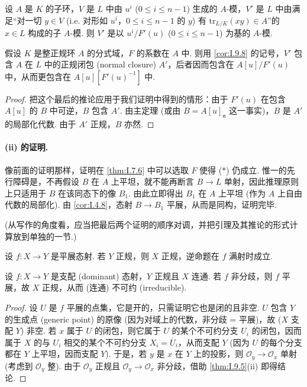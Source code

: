 \begin{corollary}\label{cor:I.9.8}
设 $A$ 是 $K$ 的子环，$V$ 是 $L$ 中由 $u^i$ ($0 \leqslant i \leqslant n-1$) 生成的 $A$-模，$V'$ 是 $L$ 中由满足``对一切 $y \in V$ (i.e. 对形如 $u^i$，$0 \leqslant i \leqslant n-1$ 的 $y$) 有 $\mathrm{tr}_{L/K}(xy) \in A$''的 $x \in L$ 构成的子 $A$-模. 则 $V'$ 是以 $u^{i}/F'(u)$ ($0 \leqslant i \leqslant n-1$) 为基的 $A$-模.
\end{corollary}

\begin{corollary}\label{cor:I.9.9}
假设 $K$ 是整正规环 $A$ 的分式域，$F$ 的系数在 $A$ 中. 则用 \ref{cor:I.9.8} 的记号，$V'$ 包含 $A$ 在 $L$ 中的正规闭包 (normal closure) $A'$，后者因而包含在 $A[u]/F'(u)$ 中，从而更包含在 $A[u][F'(u)^{-1}]$ 中.
\end{corollary}

\begin{proof}
把这个最后的推论应用于我们证明中得到的情形：由于 $F'(u)$ 在包含 $A[u]$ 的 $B$ 中可逆，$B$ 包含 $A'$. 由主定理 (或由 $B = A[u]_{\mathfrak{n}}$ 这一事实)，$B$ 是 $A'$ 的局部化代数. 由于 $A'$ 正规，$B$ 亦然.
\end{proof}

\paragraph*{(ii) 的证明.} 像前面的证明那样，证明在 \ref{thm:I.7.6} 中可以选取 $F$ 使得 ($*$) 仍成立. 惟一的先行障碍是，不再假设 $B$ 在 $A$ 上平坦，就不能再断言 $B \to L$ 单射，因此推理原则上只适用于 $B$ 在该同态下的像 $B_1$. 由此立即得出 $B_1$ 在 $A$ 上平坦 (作为 $A$ 上自由代数的局部化). 由 \ref{cor:I.4.8}，态射 $B \to B_1$ 平展，从而是同构，证明完毕.

(从写作的角度看，应当把最后两个证明的顺序对调，并把引理及其推论的形式计算放到单独的一节.)

\begin{corollary}\label{cor:I.9.10}
设 $f \colon X \to Y$ 是平展态射. 若 $Y$ 正规，则 $X$ 正规，逆命题在 $f$ 满射时成立.
\end{corollary}

\begin{corollary}\label{cor:I.9.11}
设 $f \colon X \to Y$ 是支配 (dominant) 态射，$Y$ 正规且 $X$ 连通. 若 $f$ 非分歧，则 $f$ 平展，故 $X$ 正规，从而 (连通) 不可约 (irreducible).
\end{corollary}

\begin{proof}
设 $U$ 是 $f$ 平展的点集，它是开的，只需证明它也是闭的且非空. $U$ 包含 $Y$ 的生成点 (generic point) 的原像 (因为对域上的代数，非分歧 = 平展)，故 ($X$ 支配 $Y$) 非空. 若 $x$ 属于 $U$ 的闭包，则它属于 $U$ 的某个不可约分支 $U_i$ 的闭包，因而属于 $X$ 的与 $U_i$ 相交的某个不可约分支 $X_i = \overline{U}_i$，从而支配 $Y$ (因为 $U$ 的每个分支都在 $Y$ 上平坦，因而支配 $Y$). 于是，若 $y$ 是 $x$ 在 $Y$ 上的投影，则 $\mathcal{O}_y \to \mathcal{O}_x$ 单射 (考虑到 $\mathcal{O}_y$ 整). 由于 $\mathcal{O}_y$ 正规且 $\mathcal{O}_y \to \mathcal{O}_x$ 非分歧，借助 \ref{thm:I.9.5}(ii) 即得结论.
\end{proof}

